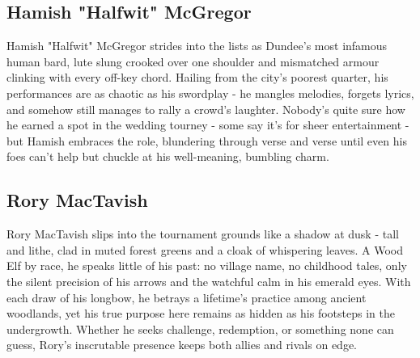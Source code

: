 \subsection*{Hamish "Halfwit" McGregor}\label{char:HamishMcGregor}
{\entryfont Hamish "Halfwit" McGregor strides into the lists as Dundee's most infamous human bard, lute slung crooked over one shoulder and mismatched armour clinking with every off-key chord. Hailing from the city's poorest quarter, his performances are as chaotic as his swordplay - he mangles melodies, forgets lyrics, and somehow still manages to rally a crowd's laughter. Nobody's quite sure how he earned a spot in the wedding tourney - some say it's for sheer entertainment - but Hamish embraces the role, blundering through verse and verse until even his foes can't help but chuckle at his well-meaning, bumbling charm.}

\vfill\eject
\subsection*{Rory MacTavish}\label{char:RoryMacTavish}
{\entryfont Rory MacTavish slips into the tournament grounds like a shadow at dusk - tall and lithe, clad in muted forest greens and a cloak of whispering leaves. A Wood Elf by race, he speaks little of his past: no village name, no childhood tales, only the silent precision of his arrows and the watchful calm in his emerald eyes. With each draw of his longbow, he betrays a lifetime's practice among ancient woodlands, yet his true purpose here remains as hidden as his footsteps in the undergrowth. Whether he seeks challenge, redemption, or something none can guess, Rory's inscrutable presence keeps both allies and rivals on edge.}

\onecolumn
